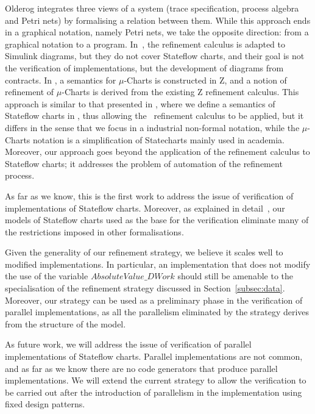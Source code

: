 \documentclass[submission]{eptcs}
\begin{document}
Olderog \cite{Olderog1991} integrates three views of a system (trace specification,
process algebra and Petri nets) by formalising a relation between them. While this approach
ends in a graphical notation, namely Petri nets, we take the opposite direction: from a
graphical notation to a program. In~\cite{Bostrom2007}, the refinement calculus is adapted
to Simulink diagrams, but they do not cover Stateflow charts, and their goal is not the verification
of implementations, but the development of diagrams from contracts. In \cite{Reeve2006},
a semantics for $\mu$-Charts is constructed in Z, and a notion of refinement of $\mu$-Charts is derived from the existing Z refinement
calculus. This approach is similar to that presented in \cite{Miyazawa2011a}, where we define a semantics
of Stateflow charts in \Circus, thus allowing the \Circus\ refinement calculus to be applied, but it differs 
in the sense that we focus in a industrial non-formal notation, while the $\mu$-Charts notation is a simplification
of Statecharts mainly used in academia. Moreover, our approach goes beyond the
application of the refinement calculus to Stateflow charts; it addresses the problem of automation of the
refinement process.

As far as we know, this is the first work to address the issue of verification of implementations
of Stateflow charts. Moreover, as explained in detail~\cite{Miyazawa2011}, our models of Stateflow charts used as the base for the verification eliminate
many of the restrictions imposed in other formalisations.

Given the generality of our refinement strategy, we believe it scales
well to modified implementations. In particular, an implementation that does
not modify the use of the variable $AbsoluteValue\_DWork$ should still be amenable to
the specialisation of the refinement strategy discussed in Section~\ref{subsec:data}.
Moreover, our strategy can be used as a preliminary phase in the verification of parallel
implementations, as all the parallelism eliminated by the strategy
derives from the structure of the model.

As future work, we will address the issue of verification of parallel implementations of
Stateflow charts. Parallel implementations are not common, and as far as we know there are
no code generators that produce parallel implementations. We will extend the current strategy to allow
the verification to be carried out after the introduction of parallelism
in the implementation using fixed design patterns.
\end{document}
